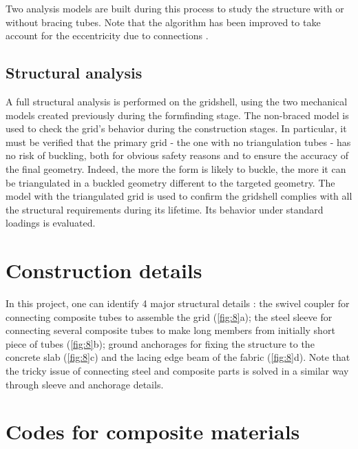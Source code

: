 Two analysis models are built during this process to study the structure with or without bracing tubes.
Note that the algorithm has been improved to take account for the eccentricity due to connections \citep{Douthe2006}.


\subsection{Structural analysis}
A full structural analysis is performed on the gridshell, using the two mechanical models created previously during the formfinding stage.
The non-braced model is used to check the grid’s behavior during the construction stages. In particular, it must be verified that the primary grid - the one with no triangulation tubes - has no risk of buckling, both for obvious safety reasons and to ensure the accuracy of the final geometry. Indeed, the more the form is likely to buckle, the more it can be triangulated in a buckled geometry different to the targeted geometry. The model with the triangulated grid is used to confirm the gridshell complies with all the structural requirements during its lifetime. Its behavior under standard loadings is evaluated.


\section{Construction details}
In this project, one can identify 4 major structural details : the swivel coupler for connecting composite tubes to assemble the grid (\autoref{fig:8}a); the steel sleeve for connecting several composite tubes to make long members from initially short piece of tubes (\autoref{fig:8}b); ground anchorages for fixing the structure to the concrete slab (\autoref{fig:8}c) and the lacing edge beam of the fabric (\autoref{fig:8}d).
Note that the tricky issue of connecting steel and composite parts is solved in a similar way through sleeve and anchorage details.

\section{Codes for composite materials}

